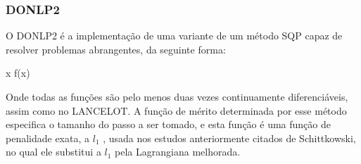 \subsubsection{DONLP2}
O DONLP2 é a implementação de uma variante de um método SQP capaz de resolver problemas 
abrangentes, da seguinte forma:

\vspace{-15pt}
\begin{mini!}
{x}{ f(x) \label{donl2_obj}}{\label{prob_donlp2}}{}
\end{mini!}

Onde todas as funções são pelo menos duas vezes continuamente diferenciáveis, assim como no
LANCELOT. A função de mérito determinada por esse método especifica o tamanho do passo a ser tomado,
e esta função é uma função de penalidade exata, a \( l_1 \) \cite{han1979exact}, usada nos estudos
anteriormente citados de Schittkowski, no qual ele substitui a \(l_1\) pela Lagrangiana melhorada.